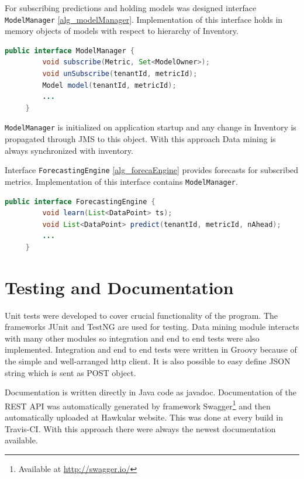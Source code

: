     For subscribing predictions and holding models was designed interface
    \texttt{ModelManager} \ref{alg_modelManager}. 
    Implementation of this interface holds in memory 
    objects of models with respect to hierarchy of Inventory.

    \begin{lstlisting}[caption={Interface Model Manager}, language=Java, label={alg_modelManager}]
     public interface ModelManager {
         void subscribe(Metric, Set<ModelOwner>);
         void unSubscribe(tenantId, metricId);
         Model model(tenantId, metricId);
         ...
     }
    \end{lstlisting}

    \texttt{ModelManager} is initialized on application startup and any change in
    Inventory is propagated through JMS to this object. With this approach Data mining is
    always synchronized with inventory. 

    Interface \texttt{ForecastingEngine} \ref{alg_forecaEngine} provides forecasts for
    subscribed metrics. Implementation of this interface contains \texttt{ModelManager}.
    
    \begin{lstlisting}[caption={Interface Forecasting Engine}, language=Java, label={alg_forecaEngine}]
     public interface ForecastingEngine {
         void learn(List<DataPoint> ts);
         void List<DataPoint> predict(tenantId, metricId, nAhead);
         ...
     }
    \end{lstlisting}

    \section{Testing and Documentation}
    Unit tests were developed to cover crucial functionality of the program. The
    frameworks JUnit and TestNG are used for testing. Data mining module interacts with many other modules so
    integration and end to end tests were also implemented. Integration and end to end
    tests were written in Groovy because of the simple and well-arranged http client. It
    is also possible to easy define JSON string which is sent as POST object.

    Documentation is written directly in Java code as javadoc. Documentation of the REST
    API was automatically generated by framework Swagger\footnote{Available at
    \url{http://swagger.io/}} and then automatically uploaded at Hawkular website. This
    was done at every build in Travis-CI. With this approach there were always the newest 
    documentation available.

